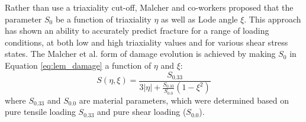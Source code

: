 \documentclass[sn-mathphys,Numbered,draft]{sn-jnl}%
\begin{document}

Rather than use a triaxiality cut-off, Malcher and co-workers \citep{malcher_improved_2014, ferreira_improved_2022, castro_calibration_2018} proposed that the parameter $S_0$ be a function of triaxiality $\eta$ as well as Lode angle $\xi$.
This approach has shown an ability to accurately predict fracture for a range of loading conditions, at both low and high triaxiality values and for various shear stress states.
The Malcher et al. form of damage evolution is achieved by making $S_0$ in Equation \ref{eq:lem_damage} a function of $\eta$ and $\xi$:
\begin{equation}
S(\eta,\xi)=\frac{S_{0.33}}{3|\eta|+\frac{S_{0.33}}{S_{0.0}}\left(1-\xi^2\right)}
\end{equation}
where $S_{0.33}$ and $S_{0.0}$ are material parameters, which were determined based on pure tensile loading $S_{0.33}$ and pure shear loading ($S_{0.0}$).

%
\end{document}
